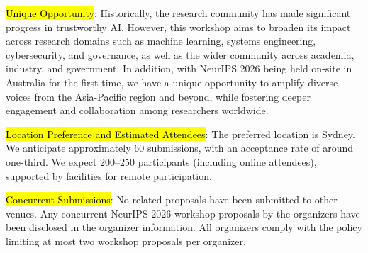 \documentclass{article}
\begin{document}
\hl{Unique Opportunity}: Historically, the research community has made significant progress in trustworthy AI. However, this workshop aims to broaden its impact across research domains such as machine learning, systems engineering, cybersecurity, and governance, as well as the wider community across academia, industry, and government. In addition, with NeurIPS 2026 being held on-site in Australia for the first time, we have a unique opportunity to amplify diverse voices from the Asia-Pacific region and beyond, while fostering deeper engagement and collaboration among researchers worldwide.

\hl{Location Preference and Estimated Attendees}: The preferred location is Sydney. We anticipate approximately 60 submissions, with an acceptance rate of around one-third. We expect 200–250 participants (including online attendees), supported by facilities for remote participation.

\hl{Concurrent Submissions}: No related proposals have been submitted to other venues. Any concurrent NeurIPS 2026 workshop proposals by the organizers have been disclosed in the organizer information. All organizers comply with the policy limiting at most two workshop proposals per organizer.
\end{document}

